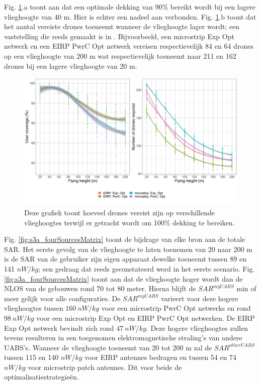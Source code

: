 \documentclass[twocolumn]{phdsymp_dutch}
\begin{document}
Fig. \ref{fig:s3a_numDronesAndCov}.a toont aan dat een optimale dekking van 90\% bereikt wordt bij een lagere vlieghoogte van 40 m.
Hier is echter een nadeel aan verbonden. 
Fig. \ref{fig:s3a_numDronesAndCov}.b 
toont dat het aantal vereiste drones toeneemt wanneer de vlieghoogte lager wordt; 
een vaststelling die reeds gemaakt is in \cite{J2}.
Bijvoorbeeld, een microstrip \gls{Exp Opt} netwerk en een \gls{EIRP} \gls{PwrC Opt} netwerk 
vereisen respectievelijk 84 en 64 drones op een vlieghoogte van 200 m wat respectievelijk toeneemt naar 
211 en 162 drones bij een lagere vlieghoogte van 20 m.

\begin{figure}[]
  \includegraphics[width=\linewidth]{../results/s3/fhvsnumdronesAndCov.png}
  \caption{Deze grafiek toont hoeveel drones vereist zijn op verschillende vlieghoogtes terwijl er getracht wordt om 100\% dekking te bereiken.}
  \label{fig:s3a_numDronesAndCov}
\end{figure}

Fig. \ref{fig:s3a_fourSourcesMatrix} toont de bijdrage van elke bron aan de totale \gls{SAR}.
Het eerste  gevolg van de vlieghoogte te laten toenemen van 20 naar 200 m is de 
  \gls{SAR}  van de gebruiker zijn eigen apparaat dewelke toeneemt tussen 89 en 141 $nW/kg$;
een gedraag dat reeds geconstateerd werd in het eerste scenario.
Fig. \ref{fig:s3a_fourSourcesMatrix} toont aan dat de vlieghoogte hoger wordt dan de \gls{NLOS} van de gebouwen 
rond 70 tot 80 meter. Hierna blijft de $SAR^{myUABS}$ min of meer gelijk voor alle configuraties.
De $SAR^{myUABS}$ varieert voor deze hogere vlieghoogtes tussen
 $160\ nW/kg$ voor een microstrip \gls{PwrC Opt} netwerks en rond $98\ nW/kg$ voor een microstrip \gls{Exp Opt} en \gls{EIRP} \gls{PwrC Opt} netwerken.
De \gls{EIRP} \gls{Exp Opt} netwerk bevindt zich rond $47\ nW/kg$.
Deze hogere vlieghoogtes zullen tevens resulteren in een toegenomen elektromagnetische straling's van andere
\gls{UABS}'s.
Wanneer de vlieghoogte toeneemt van 20 tot 200 m zal de $SAR^{otherUABS}$ tussen 115 en 140
$nW/kg$ voor \gls{EIRP} antennes bedragen en tussen 54 en 74 $nW/kg$ voor microstrip patch antennes.
Dit voor beide de optimalisatiestrategie\"en.
\end{document}
